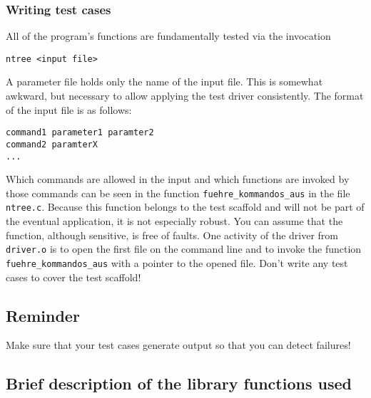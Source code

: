 \subsubsection*{Writing test cases}

All of the program's functions are fundamentally tested via the
invocation 
\begin{verbatim}
ntree <input file>
\end{verbatim}
A parameter file holds only the name of the input file.
This is somewhat awkward, but necessary to allow applying 
the test driver consistently.
The format of the input file is as follows:
\begin{verbatim}
command1 parameter1 paramter2
command2 paramterX
...
\end{verbatim}

Which commands are allowed in the input and which functions are
invoked by those commands can be seen in the function 
{\tt fuehre\_kommandos\_aus} in the file {\tt ntree.c}.
Because this function belongs to the test scaffold and will not
be part of the eventual application, it is not especially robust.
You can assume that the function, although sensitive, is free of
faults. 
One activity of the driver from {\tt driver.o} is to open the first
file on the command line and to invoke the function {\tt
fuehre\_kommandos\_aus} with a pointer to the opened file.
Don't write any test cases to cover the test scaffold!

\subsection*{Reminder}

Make sure that your test cases generate output so that you can
detect failures!

\subsection*{Brief description of the library functions used}


